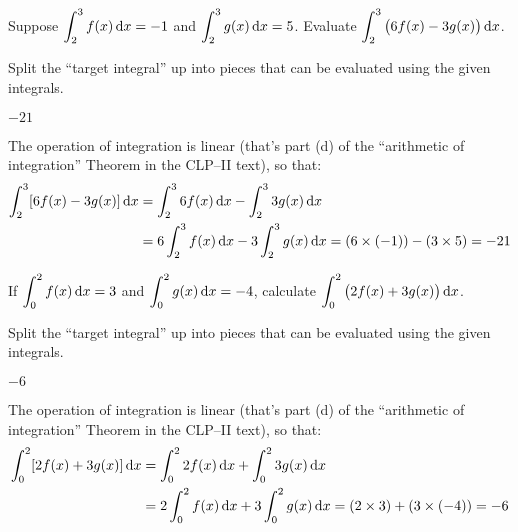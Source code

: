 \subsection*{\Procedural}

\begin{question}[M105 2015A]
Suppose $\displaystyle\int_2^3 f(x)\,\mathrm{d}x = -1$ and
$\displaystyle\int_2^3 g(x)\,\mathrm{d}x = 5$. Evaluate
$\displaystyle \int_2^3 \big( 6 f(x) - 3 g(x) \big)\,\mathrm{d}x$.
\end{question}

\begin{hint}
Split the ``target integral'' up into pieces that can be evaluated using the given integrals.
\end{hint}

\begin{answer}
$-21$
\end{answer}

\begin{solution}
The operation of integration is linear (that's
part (d) of the ``arithmetic of integration''
Theorem   in the CLP--II text),
so that:
\begin{align*}
\int_2^3 [6 f(x) -3 g(x)]\,\mathrm{d}x
&= \int_2^3 6 f(x)\,\mathrm{d}x  - \int_2^3 3 g(x)\,\mathrm{d}x \\
&= 6 \int_2^3  f(x)\,\mathrm{d}x  - 3\int_2^3 g(x)\,\mathrm{d}x
= (6 \times (-1)) - (3 \times 5)
= -21
\end{align*}

\end{solution}


\begin{question}[2016Q1]
If $\displaystyle\int_0^2 f(x)\,\mathrm{d}x = 3$ and
$\displaystyle\int_0^2 g(x)\,\mathrm{d}x = -4$, calculate
$\displaystyle \int_0^2 \big( 2 f(x) + 3 g(x) \big)\,\mathrm{d}x$.
\end{question}

\begin{hint}
Split the ``target integral'' up into pieces that can be evaluated using the given integrals.
\end{hint}

\begin{answer}
$-6$
\end{answer}

\begin{solution}
The operation of integration is linear (that's
part (d) of the ``arithmetic of integration''
Theorem   in the CLP--II text),
so that:
\begin{align*}
\int_0^2 [2 f(x) +3 g(x)]\,\mathrm{d}x
   &= \int_0^2 2 f(x)\,\mathrm{d}x  + \int_0^2 3 g(x)\,\mathrm{d}x \\
&= 2 \int_0^2  f(x)\,\mathrm{d}x  + 3\int_0^2 g(x)\,\mathrm{d}x = (2 \times 3) + (3 \times (-4)) = -6
\end{align*}

\end{solution}


